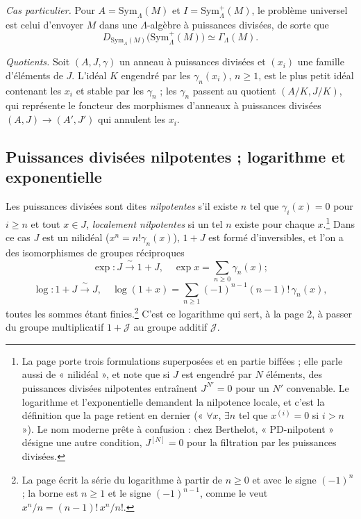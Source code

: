 \documentclass[11pt,a4paper]{article}
\begin{document}
\emph{Cas particulier.} Pour $A = \mathrm{Sym}_\Lambda(M)$ et $I =
\mathrm{Sym}^{+}_\Lambda(M)$, le problème universel est celui d'envoyer $M$
dans une $\Lambda$-algèbre à puissances divisées, de sorte que
\[
D_{\mathrm{Sym}_\Lambda(M)}\bigl(\mathrm{Sym}^{+}_\Lambda(M)\bigr) \simeq
\Gamma_\Lambda(M).
\]

\emph{Quotients.} Soit $(A, J, \gamma)$ un anneau à puissances divisées et
$(x_i)$ une famille d'éléments de $J$. L'idéal $K$ engendré par les
$\gamma_n(x_i)$, $n \geqslant 1$, est le plus petit idéal contenant les $x_i$
et stable par les $\gamma_n$ ; les $\gamma_n$ passent au quotient
$(A/K, J/K)$, qui représente le foncteur des morphismes d'anneaux à
puissances divisées $(A, J) \to (A', J')$ qui annulent les $x_i$.

\subsection*{Puissances divisées nilpotentes ; logarithme et exponentielle}

Les puissances divisées sont dites \emph{nilpotentes} s'il existe $n$ tel
que $\gamma_i(x) = 0$ pour $i \geqslant n$ et tout $x \in J$, \emph{localement
nilpotentes} si un tel $n$ existe pour chaque $x$.\footnote{La page porte
trois formulations superposées et en partie biffées ; elle parle aussi de
« nilidéal », et note que si $J$ est engendré par $N$ éléments, des
puissances divisées nilpotentes entraînent $J^{N'} = 0$ pour un $N'$
convenable. Le logarithme et l'exponentielle demandent la
nilpotence locale, et c'est la définition que la page retient en dernier
(« $\forall x$, $\exists n$ tel que $x^{(i)} = 0$ si $i > n$ »). Le nom
moderne prête à confusion : chez Berthelot, « PD-nilpotent » désigne une
autre condition, $J^{[N]} = 0$ pour la filtration par les puissances divisées.}
Dans ce cas $J$ est un nilidéal ($x^{n} = n!\gamma_n(x)$), $1 + J$ est
formé d'inversibles, et l'on a des isomorphismes de groupes réciproques
\[
\exp : J \xrightarrow{\ \sim\ } 1 + J, \quad \exp x = \sum_{n \geqslant 0}
\gamma_n(x) ;
\]
\[
\log : 1 + J \xrightarrow{\ \sim\ } J, \quad \log(1+x) = \sum_{n \geqslant 1}
(-1)^{n-1}(n-1)!\,\gamma_n(x) ,
\]
toutes les sommes étant finies.\footnote{La page écrit la série du
logarithme à partir de $n \geqslant 0$ et avec le signe $(-1)^{n}$ ; la
borne est $n \geqslant 1$ et le signe $(-1)^{n-1}$, comme le veut
$x^{n}/n = (n-1)!\,x^{n}/n!$.} C'est ce logarithme qui sert, à la page 2, à
passer du groupe multiplicatif $1 + \mathcal{J}$ au groupe additif
$\mathcal{J}$.
\end{document}
